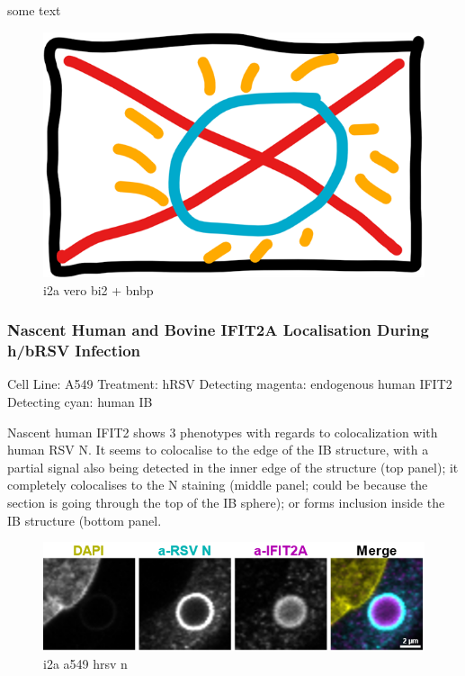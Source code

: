 some text

\begin{figure}
    \centering
    \includegraphics[width=0.5\linewidth]{09. Chapter 4//Figs//01. I2A/00. placeholder.png}
    \caption[i2a vero bi2 + bnbp]{i2a vero bi2 + bnbp}
    \label{i2a vero bi2 + bnbp}
\end{figure}

\subsubsection{Nascent Human and Bovine IFIT2A Localisation During h/bRSV Infection} \label{Nascent Human and Bovine IFIT2A Localisation During h/bRSV Infection}
Cell Line: A549 \newline
Treatment: hRSV \newline
Detecting magenta: endogenous human IFIT2  \newline
Detecting cyan: human IB \newline

Nascent human IFIT2 shows 3 phenotypes with regards to colocalization with human RSV N. It seems to colocalise to the edge of the IB structure, with a partial signal also being detected in the inner edge of the structure (top panel); it completely colocalises to the N staining (middle panel; could be because the section is going through the top of the IB sphere); or forms inclusion inside the IB structure (bottom panel. 

\begin{figure}
    \centering
    \includegraphics[width=1\linewidth]{09. Chapter 4//Figs//01. I2A/04. i2a a549 hrsv n.png}
    \caption[i2a a549 hrsv n]{i2a a549 hrsv n}
    \label{i2a a549 hrsv n}
\end{figure}

